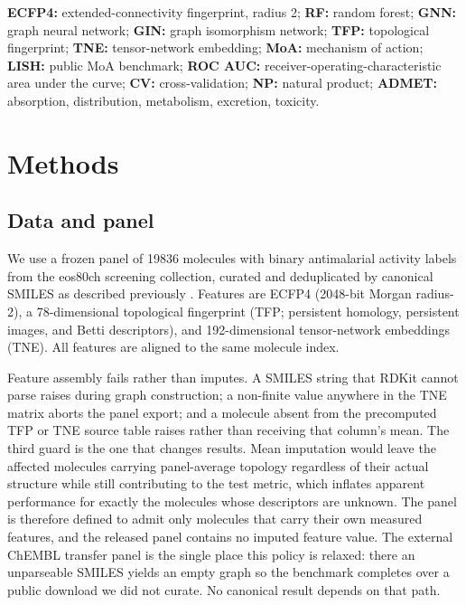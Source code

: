 \documentclass[11pt,a4paper]{article}
\begin{document}
\textbf{ECFP4:} extended-connectivity fingerprint, radius \num{2}; \textbf{RF:} random forest; \textbf{GNN:} graph neural network; \textbf{GIN:} graph isomorphism network; \textbf{TFP:} topological fingerprint; \textbf{TNE:} tensor-network embedding; \textbf{MoA:} mechanism of action; \textbf{LISH:} public MoA benchmark; \textbf{ROC AUC:} receiver-operating-characteristic area under the curve; \textbf{CV:} cross-validation; \textbf{NP:} natural product; \textbf{ADMET:} absorption, distribution, metabolism, excretion, toxicity.

\section{Methods}

\subsection{Data and panel}

We use a frozen panel of \num{19836} molecules with binary antimalarial activity labels from the eos80ch screening collection, curated and deduplicated by canonical SMILES as described previously \citep{temgoua2026antimalarial}. Features are ECFP4 (\num{2048}-bit Morgan radius-\num{2}), a \num{78}-dimensional topological fingerprint (TFP; persistent homology, persistent images, and Betti descriptors), and \num{192}-dimensional tensor-network embeddings (TNE). All features are aligned to the same molecule index.

Feature assembly fails rather than imputes. A SMILES string that RDKit cannot parse raises during graph construction; a non-finite value anywhere in the TNE matrix aborts the panel export; and a molecule absent from the precomputed TFP or TNE source table raises rather than receiving that column's mean. The third guard is the one that changes results. Mean imputation would leave the affected molecules carrying panel-average topology regardless of their actual structure while still contributing to the test metric, which inflates apparent performance for exactly the molecules whose descriptors are unknown. The panel is therefore defined to admit only molecules that carry their own measured features, and the released panel contains no imputed feature value. The external ChEMBL transfer panel is the single place this policy is relaxed: there an unparseable SMILES yields an empty graph so the benchmark completes over a public download we did not curate. No canonical result depends on that path.
\end{document}
